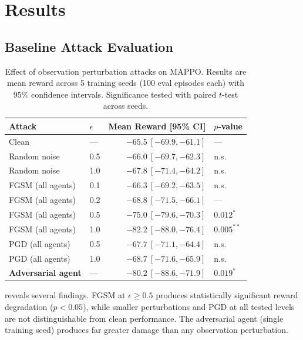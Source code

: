 \documentclass[12pt,a4paper]{article}
\begin{document}
\section{Results}
\label{sec:results}

\subsection{Baseline Attack Evaluation}

\begin{table}[H]
\centering
\caption{Effect of observation perturbation attacks on MAPPO. Results are mean reward across 5 training seeds (100 eval episodes each) with 95\% confidence intervals. Significance tested with paired $t$-test across seeds.}
\label{tab:obs_attacks}
\begin{tabular}{llrl}
\toprule
Attack & $\epsilon$ & Mean Reward [95\% CI] & $p$-value \\
\midrule
Clean & --- & $-65.5\ [-69.9, -61.1]$ & --- \\
\midrule
Random noise & 0.5 & $-66.0\ [-69.7, -62.3]$ & n.s. \\
Random noise & 1.0 & $-67.8\ [-71.4, -64.2]$ & n.s. \\
\midrule
FGSM (all agents) & 0.1 & $-66.3\ [-69.2, -63.5]$ & n.s. \\
FGSM (all agents) & 0.2 & $-68.8\ [-71.5, -66.1]$ & --- \\
FGSM (all agents) & 0.5 & $-75.0\ [-79.6, -70.3]$ & $0.012^*$ \\
FGSM (all agents) & 1.0 & $-82.2\ [-88.0, -76.4]$ & $0.005^{**}$ \\
\midrule
PGD (all agents) & 0.5 & $-67.7\ [-71.1, -64.4]$ & n.s. \\
PGD (all agents) & 1.0 & $-68.7\ [-71.6, -65.9]$ & n.s. \\
\midrule
\textbf{Adversarial agent} & --- & $\mathbf{-80.2\ [-88.6, -71.9]}$ & $0.019^*$ \\
\bottomrule
\end{tabular}
\end{table}

 reveals several findings. FGSM at $\epsilon \geq 0.5$ produces statistically significant reward degradation ($p < 0.05$), while smaller perturbations and PGD at all tested levels are not distinguishable from clean performance. The adversarial agent (single training seed) produces far greater damage than any observation perturbation.
\end{document}

